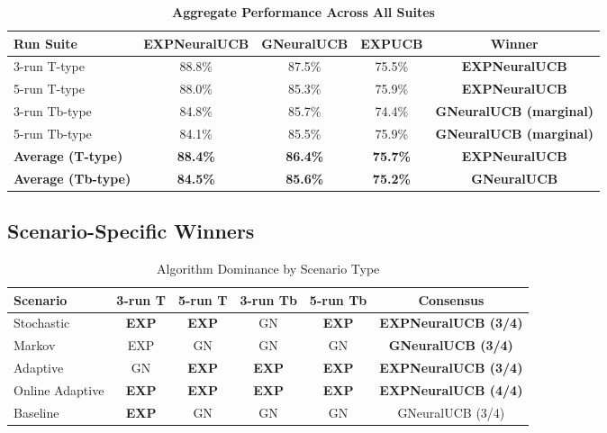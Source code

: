 \documentclass[11pt,a4paper]{article}
\newcommand{\performance}[1]{\textcolor{performancecolor}{\textbf{#1}}}
\begin{document}
\begin{table}[H]
\centering
\caption{\performance{Aggregate Performance Across All Suites}}
\small
\begin{tabular}{|l|c|c|c|c|}
\hline
\textbf{Run Suite} & \textbf{EXPNeuralUCB} & \textbf{GNeuralUCB} & \textbf{EXPUCB} & \textbf{Winner} \\
\hline
\hline
3-run T-type   & 88.8\% & 87.5\% & 75.5\% & \performance{EXPNeuralUCB} \\
5-run T-type   & 88.0\% & 85.3\% & 75.9\% & \performance{EXPNeuralUCB} \\
3-run Tb-type  & 84.8\% & 85.7\% & 74.4\% & \performance{GNeuralUCB (marginal)} \\
5-run Tb-type  & 84.1\% & 85.5\% & 75.9\% & \performance{GNeuralUCB (marginal)} \\
\hline
\textbf{Average (T-type)}  & \textbf{88.4\%} & \textbf{86.4\%} & \textbf{75.7\%} & \textbf{EXPNeuralUCB} \\
\textbf{Average (Tb-type)} & \textbf{84.5\%} & \textbf{85.6\%} & \textbf{75.2\%} & \textbf{GNeuralUCB} \\
\hline
\end{tabular}
\end{table}

\subsection{Scenario-Specific Winners}

\begin{table}[H]
\centering
\caption{Algorithm Dominance by Scenario Type}
\begin{tabular}{|l|c|c|c|c|c|}
\hline
\textbf{Scenario} & \textbf{3-run T} & \textbf{5-run T} & \textbf{3-run Tb} & \textbf{5-run Tb} & \textbf{Consensus} \\
\hline
\hline
Stochastic      & \textbf{EXP} & \textbf{EXP} & GN & \textbf{EXP} & \textbf{EXPNeuralUCB (3/4)} \\
Markov          & EXP          & GN           & GN & GN           & \textbf{GNeuralUCB (3/4)} \\
Adaptive        & GN           & \textbf{EXP} & \textbf{EXP} & \textbf{EXP} & \textbf{EXPNeuralUCB (3/4)} \\
Online Adaptive & \textbf{EXP} & \textbf{EXP} & \textbf{EXP} & \textbf{EXP} & \textbf{EXPNeuralUCB (4/4)} \\
Baseline        & \textbf{EXP} & GN           & GN & GN           & GNeuralUCB (3/4) \\
\hline
\end{tabular}
\end{table}
\end{document}
